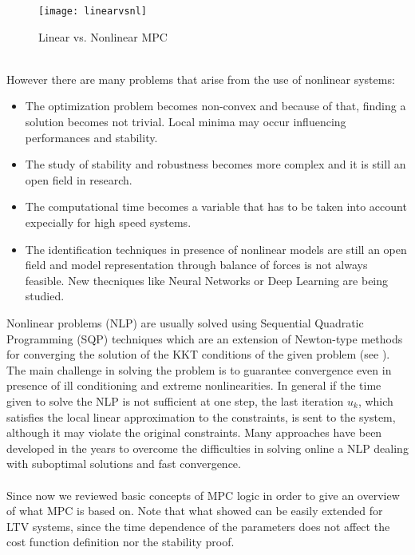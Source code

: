 \begin{figure}[h!]
	\centering
	\texttt{[image: linearvsnl]}
	\caption{Linear vs. Nonlinear MPC}
	\label{linearvsnl}
\end{figure}\\
However there are many problems that arise from the use of nonlinear systems:
\begin{itemize}
\item The optimization problem becomes non-convex and because of that, finding a solution becomes not trivial. Local minima may occur influencing performances and stability.
\item The study of stability and robustness becomes more complex and it is still an open field in research.
\item The computational time becomes a variable that has to be taken into account expecially for high speed systems.
\item The identification techniques in presence of nonlinear models are still an open field and model representation through balance of forces is not always feasible. New thecniques like Neural Networks or Deep Learning are being studied.
\end{itemize} 
Nonlinear problems (NLP) are usually solved using Sequential Quadratic Programming (SQP) techniques which are an extension of Newton-type methods for converging the solution of the KKT conditions of the given problem (see \cite{skkt}). The main challenge in solving the problem is to guarantee convergence even in presence of ill conditioning and extreme nonlinearities.
In general if the time given to solve the NLP is not sufficient at one step, the last iteration $u_k$, which satisfies the local linear approximation to the constraints, is sent to the system, although it may violate the original constraints. Many approaches have been developed in the years to overcome the difficulties in solving online a NLP dealing with suboptimal solutions and fast convergence. 
\\\\Since now we reviewed basic concepts of MPC logic in order to give an overview of what MPC is based on. Note that what showed can be easily extended for LTV systems, since the time dependence of the parameters does not affect the cost function definition nor the stability proof.